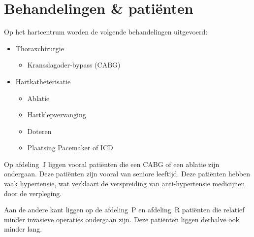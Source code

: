 \documentclass[nohyper,nobib]{tufte-book} %
\newcommand{\afdelingj}{afdeling~J }
\begin{document}
\section{Behandelingen \& patiënten}

Op het hartcentrum worden de volgende behandelingen uitgevoerd:

    \begin{itemize}
        \item Thoraxchirurgie
            \begin{itemize}
                \item Kransslagader-bypass (CABG)
            \end{itemize}
        \item Hartkatheterisatie
            \begin{itemize}
                \item Ablatie
                \item Hartklepvervanging
                \item Doteren
                \item Plaatsing Pacemaker of ICD
            \end{itemize}
    \end{itemize}

    Op \afdelingj liggen vooral patiënten die een CABG of een ablatie zijn ondergaan. Deze patiënten zijn vooral van seniore leeftijd. Deze patiënten hebben vaak hypertensie, wat verklaart de verspreiding van anti-hypertensie medicijnen door de verpleging.

    Aan de andere kant liggen op de afdeling~P en afdeling~R patiënten die relatief minder invasieve operaties ondergaan zijn. Deze patiënten liggen derhalve ook minder lang.
\end{document}
